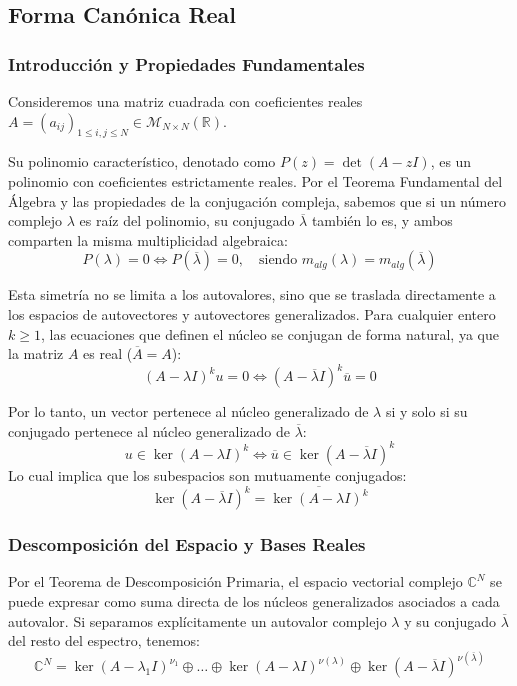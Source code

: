 \subsection{Forma Canónica Real}

\subsubsection{Introducción y Propiedades Fundamentales}

Consideremos una matriz cuadrada con coeficientes reales $A = (a_{ij})_{1 \le i,j \le N} \in \mathcal{M}_{N \times N}(\mathbb{R})$. 

Su polinomio característico, denotado como $P(z) = \det(A - zI)$, es un polinomio con coeficientes estrictamente reales. Por el Teorema Fundamental del Álgebra y las propiedades de la conjugación compleja, sabemos que si un número complejo $\lambda$ es raíz del polinomio, su conjugado $\overline{\lambda}$ también lo es, y ambos comparten la misma multiplicidad algebraica:
$$ P(\lambda) = 0 \iff P(\overline{\lambda}) = 0, \quad \text{siendo } m_{alg}(\lambda) = m_{alg}(\overline{\lambda}) $$

Esta simetría no se limita a los autovalores, sino que se traslada directamente a los espacios de autovectores y autovectores generalizados. Para cualquier entero $k \ge 1$, las ecuaciones que definen el núcleo se conjugan de forma natural, ya que la matriz $A$ es real ($\overline{A} = A$):
$$ (A - \lambda I)^k u = 0 \iff (A - \overline{\lambda} I)^k \overline{u} = 0 $$

Por lo tanto, un vector pertenece al núcleo generalizado de $\lambda$ si y solo si su conjugado pertenece al núcleo generalizado de $\overline{\lambda}$:
$$ u \in \ker(A - \lambda I)^k \iff \overline{u} \in \ker(A - \overline{\lambda} I)^k $$
Lo cual implica que los subespacios son mutuamente conjugados:
$$ \ker(A - \overline{\lambda} I)^k = \overline{\ker(A - \lambda I)^k} $$

\subsubsection{Descomposición del Espacio y Bases Reales}

Por el Teorema de Descomposición Primaria, el espacio vectorial complejo $\mathbb{C}^N$ se puede expresar como suma directa de los núcleos generalizados asociados a cada autovalor. Si separamos explícitamente un autovalor complejo $\lambda$ y su conjugado $\overline{\lambda}$ del resto del espectro, tenemos:
$$ \mathbb{C}^N = \ker(A - \lambda_1 I)^{\nu_1} \oplus \dots \oplus \ker(A - \lambda I)^{\nu(\lambda)} \oplus \ker(A - \overline{\lambda} I)^{\nu(\overline{\lambda})} $$

